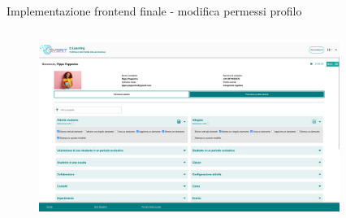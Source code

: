 \documentclass[aspectratio=169]{beamer}
\begin{document}
\begin{frame}[fragile]{Implementazione frontend finale - modifica permessi profilo}
	\begin{columns}[T]
		\begin{column}{0.7\textwidth}
			\begin{figure}
				\centering
				\includegraphics[width=\textwidth]{../images/permission-management-desktop-profile.png}
			\end{figure}
		\end{column}
		\begin{column}{0.2\textwidth}
			\begin{figure}
				\centering

\end{figure}
\end{column}
\end{columns}
\end{frame}
\end{document}
